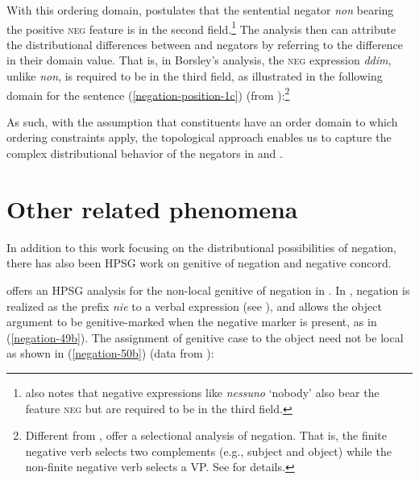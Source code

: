 \documentclass[output=paper,biblatex,babelshorthands,newtxmath,draftmode,colorlinks,citecolor=brown]{langscibook}
\begin{document}
\begin{exe}
\begin{xlist}
\begin{exe}
\begin{xlist}
\ea
{}
\z
%
With this ordering domain, \citet{Borsley:06} postulates
that the  sentential negator \emph{non} bearing the positive \textsc{neg} feature is in the second field.\footnote{
\citet{Borsley:06} also notes that  negative expressions like \emph{nessuno} `nobody' also bear the feature \textsc{neg}
but are required to be in the third field.}
The analysis then can attribute the distributional differences between  and  negators
by referring to the difference in their domain value. That is,
in Borsley's analysis, the  \textsc{neg} expression \emph{ddim}, unlike  \emph{non},
is required to be in the third field, as illustrated in the following domain for the sentence (\ref{negation-position-1c}) (from
\citealt[]{Borsley:06}):\footnote{Different from \citet{Borsley:06}, \citet{BJ:00} offer  a selectional analysis of  negation.
That is, the finite negative verb selects
two complements (e.g., subject and object) while
the non-finite negative verb selects a VP. See \citet{BJ:00} for details.}

\ea
{}
\z
As such,  with the assumption that constituents have an order domain to which ordering
constraints apply, the topological approach enables us to capture the complex distributional
behavior of the negators in  and .

\section{Other related phenomena}
\label{negation:sec-other-phenomena}

In addition to this work focusing on the distributional possibilities of negation, there has also
been HPSG work on genitive of negation and negative concord.

\citet{Prz:00} offers an HPSG analysis for the non-local genitive of negation in .  In
, negation is realized as the prefix \emph{nie} to a verbal expression (see
\citealt{PK:99, Prz:00, Prz:01}), and  allows the object argument to be genitive-marked
when the negative marker is present, as in (\ref{negation-49b}).  The assignment of genitive case
to the object need not be local as shown in (\ref{negation-50b}) (data from \citealt[]{Prz:00}):


\end{xlist}
\end{exe}
\end{xlist}
\end{exe}
\end{document}
